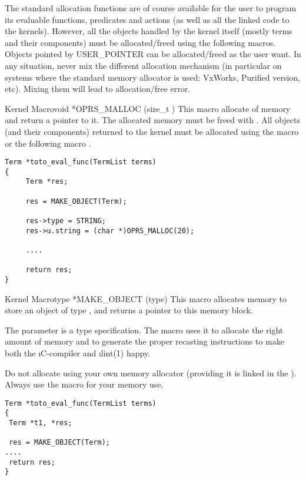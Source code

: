  The standard allocation functions are of
course available for the user to program its evaluable functions, predicates
and actions (as well as all the linked code to the kernels). However, all the
objects handled by the kernel itself (mostly terms and their components) must
be allocated/freed using the following macros. Objects pointed by USER\_POINTER
can be allocated/freed as the user want. In any situation, never mix the
different allocation mechanism (in particular on systems where the standard
memory allocator is used: VxWorks, Purified version, etc). Mixing them will
lead to allocation/free error.

\begin{typefn}{Kernel Macro}{void *}{OPRS\_MALLOC} {(size\_t )}
This macro allocate  of memory and return a pointer to
it. The allocated memory must be freed with .  
All objects (and their components) returned to the kernel must be allocated
using the
 macro or the following macro .
\begin{verbatim}
Term *toto_eval_func(TermList terms)
{
     Term *res;

     res = MAKE_OBJECT(Term);

     res->type = STRING;
     res->u.string = (char *)OPRS_MALLOC(20);

     ....

     return res;
}
\end{verbatim}
\end{typefn}

\begin{typefn}{Kernel Macro}{type *}{MAKE\_OBJECT} {(type)}
This macro allocates memory to store an object of type , and
returns a pointer to this memory block.

The parameter is a type specification. The macro uses it to allocate
the right amount of memory and to generate the proper recasting
instructions to make both the \i{C}-compiler and \i{lint(1)} happy.

 Do not allocate using your own memory allocator
(providing it is linked in the \CPK). Always use the 
macro for your memory use.

\begin{verbatim}
Term *toto_eval_func(TermList terms)
{
 Term *t1, *res;

 res = MAKE_OBJECT(Term);
....
 return res;
}
\end{verbatim}
\end{typefn}


